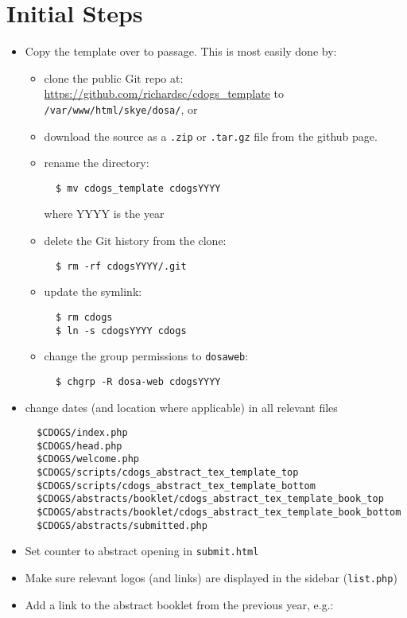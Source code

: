 \documentclass[letterpaper,12pt]{article}
\begin{document}
\section{Initial Steps}\label{s:initial}

\begin{itemize}
\item Copy the template over to passage. This is most easily done by:
  \begin{itemize}
  \item clone the public Git repo at: 
    \url{https://github.com/richardsc/cdogs_template} to
    \verb|/var/www/html/skye/dosa/|, or
  \item download the source as a
    \verb|.zip| or \verb|.tar.gz| file from the github page.
  \item rename the directory:
\begin{verbatim}
  $ mv cdogs_template cdogsYYYY
\end{verbatim}
    where YYYY is the year
  \item delete the Git history from the clone:
\begin{verbatim}
  $ rm -rf cdogsYYYY/.git
\end{verbatim}
  \item update the symlink:
\begin{verbatim}
  $ rm cdogs
  $ ln -s cdogsYYYY cdogs
\end{verbatim}
  \item change the group permissions to \verb|dosaweb|:
\begin{verbatim}
  $ chgrp -R dosa-web cdogsYYYY
\end{verbatim}
  \end{itemize}
\item change dates (and location where applicable) in all relevant files
  \vspace{-1em}
\begin{verbatim}
  $CDOGS/index.php
  $CDOGS/head.php
  $CDOGS/welcome.php
  $CDOGS/scripts/cdogs_abstract_tex_template_top
  $CDOGS/scripts/cdogs_abstract_tex_template_bottom
  $CDOGS/abstracts/booklet/cdogs_abstract_tex_template_book_top
  $CDOGS/abstracts/booklet/cdogs_abstract_tex_template_book_bottom
  $CDOGS/abstracts/submitted.php
\end{verbatim}
\item Set counter to abstract opening in \verb|submit.html|
\item Make sure relevant logos (and links) are displayed in the
  sidebar (\verb|list.php|)
\item Add a link to the abstract booklet from the previous year, e.g.:

\end{itemize}
\end{document}
